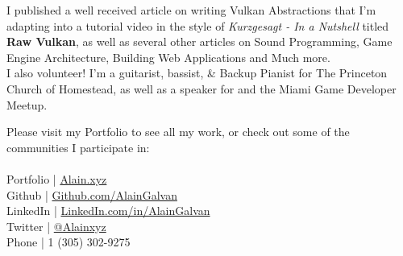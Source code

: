 \documentclass[10pt,a4paper]{article}
\begin{document}
\begin{multicols}{2}
\vspace{1.3em}

I published a well received article on writing Vulkan Abstractions that I'm adapting into a tutorial video in the style of \textit{Kurzgesagt - In a Nutshell} titled \textbf{Raw Vulkan}, as well as several other articles on Sound Programming, Game Engine Architecture, Building Web Applications and Much more. \\

I also volunteer! I'm a guitarist, bassist, \& Backup Pianist for The Princeton Church of Homestead, as well as a speaker for  and the Miami Game Developer Meetup. 


Please visit my Portfolio to see all my work, or check out some of the communities I participate in: \\ \\
\noindent
\noindent \bull Portfolio | \href{https://alain.xyz}{Alain.xyz} \\
\bull Github | \href{https://github.com/alaingalvan}{Github.com/AlainGalvan} \\
\bull LinkedIn | \href{https://linkedin.com/in/alaingalvan}{LinkedIn.com/in/AlainGalvan} \\
\bull Twitter | \href{https://twitter.com/alainxyz}{@Alainxyz} \\
\bull Phone | \textsmaller{+}1 (305) 302-9275

\end{multicols}
\end{document}
